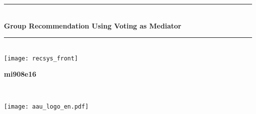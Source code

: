 \begin{titlepage}

\newcommand{\HRule}{\rule{\linewidth}{0.5mm}} %
\center%




\HRule \\[0.4cm]
{ \Huge \bfseries Group Recommendation Using Voting as Mediator}\\[0.4cm] %
\HRule \\[1.5cm]
\texttt{[image: recsys\_front]}

\vfill %

\begin{minipage}[t]{0.4\textwidth}
\begin{flushleft} \large
\textbf{mi908e16}\\
\groupmembersbyfirstname{}
\end{flushleft}
\end{minipage}
~%
\begin{minipage}[t][][b]{0.4\textwidth}
\begin{flushright}
\hfill
\texttt{[image: aau\_logo\_en.pdf]}
\end{flushright}
\end{minipage}\\

\endcenter{}

\end{titlepage}
